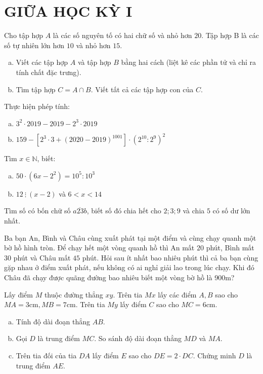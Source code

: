 \section{GIỮA HỌC KỲ I}
\setcounter{ex}{0}
\begin{ex}
Cho tập hợp $A$ là các số nguyên tố có hai chữ số và nhỏ hơn $20$. Tập hợp B là các số tự nhiên lớn hơn $10$ và nhỏ hơn $15$.
\begin{enumerate}[a)]
	\item Viết các tập hợp $A$ và tập hợp $B$ bằng hai cách (liệt kê các phần tử và chỉ ra tính chất đặc trưng).
	\item Tìm tập hợp $C=A \cap B$. Viết tất cả các tập hợp con của $C$.
	\end{enumerate}
\end{ex}
\begin{ex}
	Thực hiện phép tính:
	\begin{enumerate}[a)]
	\item $3^{2} \cdot 2019-2019-2^{3} \cdot 2019$
	\item $159-\left[2^{3} \cdot 3+(2020-2019)^{1001}\right] \cdot\left(2^{10}: 2^{9}\right)^{2}$
	\end{enumerate}
\end{ex}
\begin{ex}
	Tìm $x \in \mathbb{N}$, biết:
	\begin{enumerate}[a)]
	\item $50 \cdot\left(6 x-2^{2}\right)=10^{5}: 10^{3}$
	\item $12 ~\vdots~(x-2)$ và $6<x<14$
	\end{enumerate}
\end{ex}
\begin{ex}
Tìm số có bốn chữ số $\overline{a 23 b}$, biết số đó chia hết cho $2; 3; 9$ và chia $5$ có số dư lớn nhất. 
\end{ex}
\begin{ex}
	Ba bạn An, Bình và Châu cùng xuất phát tại một điểm và cùng chạy quanh một bờ hồ hình tròn. Để chạy hết một vòng quanh hồ thì An mất $20$ phút, Bình mất $30$ phút và Châu mất $45$ phút. Hỏi sau ít nhất bao nhiêu phút thì cả ba bạn cùng gặp nhau ở điểm xuất phát, nếu không có ai nghỉ giải lao trong lúc chạy. Khi đó Châu đã chạy được quãng đường bao nhiêu biết một vòng bờ hồ là 900m?
\end{ex}
\begin{ex}
	Lấy điểm $M$ thuộc đường thẳng $x y$. Trên tia $M x$ lấy các điểm $A, B$ sao cho $M A=3 \mathrm{cm}, M B=7 \mathrm{cm}$. Trên tia $M y$ lấy điểm $C$ sao cho $M C=6 \mathrm{cm}$.
\begin{enumerate}[a)]
	\item Tính độ dài đoạn thẳng $AB$.
	\item Gọi $D$ là trung điểm $MC$. So sánh độ dài đoạn thẳng $MD$ và $MA$. 
	\item Trên tia đối của tia $DA$ lấy điểm $E$ sao cho $DE=2\cdot DC$. Chứng minh $D$ là trung điểm $AE$.
	\end{enumerate}
\end{ex}

